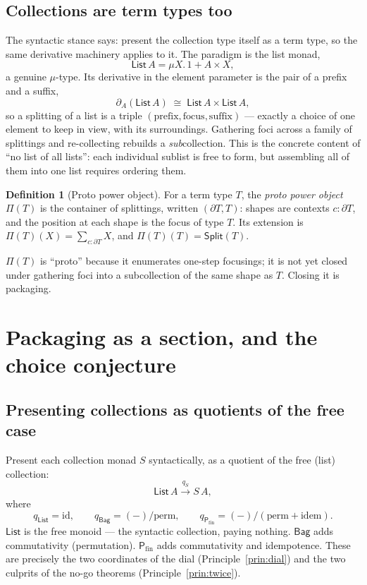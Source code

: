 \documentclass[11pt]{article}
\theoremstyle{definition}
\newtheorem{definition}{Definition}[section]
\theoremstyle{plain}
\newcommand{\p}{\partial}
\newcommand{\T}{T}
\newcommand{\Coll}{S}
\newcommand{\List}{\mathsf{List}}
\newcommand{\Mset}{\mathsf{Bag}}
\newcommand{\Pfin}{\mathsf{P}_{\mathrm{fin}}}
\newcommand{\Split}{\mathsf{Split}}
\newcommand{\Proto}{\Pi}
\newcommand{\id}{\mathrm{id}}
\newcommand{\qmap}{q}
\begin{document}
\subsection{Collections are term types too}

The syntactic stance says: present the collection type itself as a term type,
so the same derivative machinery applies to it. The paradigm is the list
monad,
\[
  \List\,A = \mu X.\, 1 + A \times X,
\]
a genuine $\mu$-type. Its derivative in the element parameter is the pair of a
prefix and a suffix,
\[
  \p_{A}(\List\,A) \;\cong\; \List\,A \times \List\,A,
\]
so a splitting of a list is a triple $(\text{prefix}, \text{focus},
\text{suffix})$ --- exactly a choice of one element to keep in view, with its
surroundings. Gathering foci across a family of splittings and re-collecting
rebuilds a \emph{sub}collection. This is the concrete content of ``no list of
all lists'': each individual sublist is free to form, but assembling all of
them into one list requires ordering them.

\begin{definition}[Proto power object]
\label{def:proto}
For a term type $\T$, the \emph{proto power object} $\Proto(\T)$ is the
container of splittings, written $(\p\T, \T)$: shapes are contexts $c : \p\T$,
and the position at each shape is the focus of type $\T$. Its extension is
$\Proto(\T)(X) = \sum_{c:\p\T} X$, and $\Proto(\T)(\T) = \Split(\T)$.
\end{definition}

$\Proto(\T)$ is ``proto'' because it enumerates one-step focusings; it is not
yet closed under gathering foci into a subcollection of the same shape as
$\T$. Closing it is packaging.

\section{Packaging as a section, and the choice conjecture}
\label{sec:packaging}

\subsection{Presenting collections as quotients of the free case}

Present each collection monad $\Coll$ syntactically, as a quotient of the
free (list) collection:
\[
  \List\,A \xrightarrow{\ \qmap_{\Coll}\ } \Coll\,A,
\]
where
\[
  \qmap_{\List} = \id, \qquad
  \qmap_{\Mset} = (-)/\text{perm}, \qquad
  \qmap_{\Pfin} = (-)/(\text{perm} + \text{idem}).
\]
$\List$ is the free monoid --- the syntactic collection, paying nothing.
$\Mset$ adds commutativity (permutation). $\Pfin$ adds commutativity and
idempotence. These are precisely the two coordinates of the dial
(Principle~\ref{prin:dial}) and the two culprits of the no-go theorems
(Principle~\ref{prin:twice}).
\end{document}
